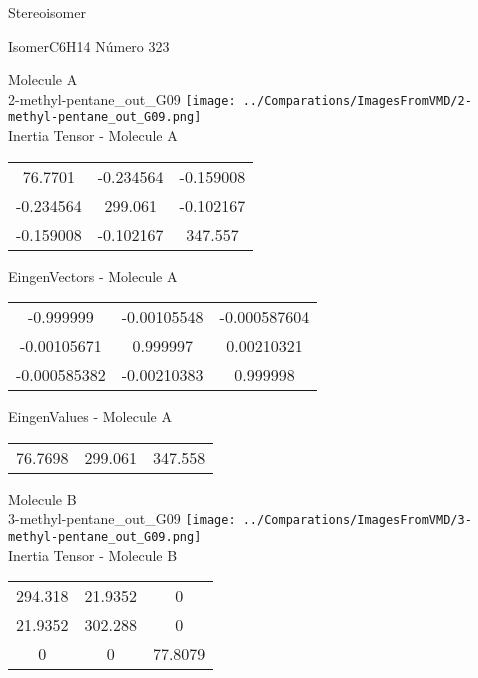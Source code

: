 \begin{center}
\vtab
\vtab
\textcolor{NavyBlue}{\Large Stereoisomer}
\end{center}

 \newpage

\vtab[-2cm]
\begin{center}
{\large IsomerC6H14 \tab Número 323}
\end{center}
\begin{multicols}{2}
\begin{center}

Molecule A \\ 
2-methyl-pentane\_out\_G09
\texttt{[image: ../Comparations/ImagesFromVMD/2-methyl-pentane\_out\_G09.png]}
\\
Inertia Tensor - Molecule A \\
\vtab

\begin{tabular}{|c c c|}
76.7701	 & 	-0.234564	 & 	-0.159008	 \\
-0.234564	 & 	299.061	 & 	-0.102167	 \\
-0.159008	 & 	-0.102167	 & 	347.557
\end{tabular}

\vtab
 EingenVectors - Molecule A     \\
\vtab
\begin{tabular}{|c c c|}
-0.999999	 & 	-0.00105548	 & 	-0.000587604	 \\
-0.00105671	 & 	0.999997	 & 	0.00210321	 \\
-0.000585382	 & 	-0.00210383	 & 	0.999998
\end{tabular}

\vtab
 EingenValues - Molecule A     \\
\vtab
\begin{tabular}{|c c c|}
76.7698	 & 	299.061	 & 	347.558	 \\
\end{tabular}
\columnbreak

Molecule B \\ 
3-methyl-pentane\_out\_G09
\texttt{[image: ../Comparations/ImagesFromVMD/3-methyl-pentane\_out\_G09.png]}
\\
Inertia Tensor - Molecule B \\
\vtab

\begin{tabular}{|c c c|}
294.318	 & 	21.9352	 & 	0	 \\
21.9352	 & 	302.288	 & 	0	 \\
0	 & 	0	 & 	77.8079
\end{tabular}


\end{center}
\end{multicols}
